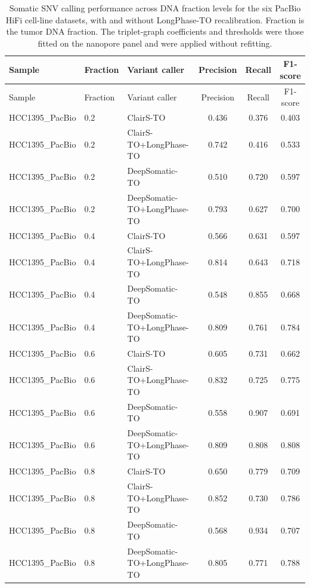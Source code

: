 \documentclass[pdflatex,sn-nature]{sn-jnl}
\begin{document}
{\small
\begin{longtable}{@{}lllccc@{}}
  \caption[Somatic SNV calling performance on the PacBio HiFi panel]%
  {Somatic SNV calling performance across DNA fraction levels for the six PacBio HiFi
  cell-line datasets, with and without LongPhase-TO recalibration. Fraction is the tumor
  DNA fraction. The triplet-graph coefficients and thresholds were those fitted on the
  nanopore panel and were applied without refitting.}
  \label{tab:pacbio_somatic_snv}\\
  \toprule
  Sample & Fraction & Variant caller & Precision & Recall & F1-score \\
  \midrule
  \endfirsthead
  \toprule
  Sample & Fraction & Variant caller & Precision & Recall & F1-score \\
  \midrule
  \endhead
  \bottomrule
  \endlastfoot
  HCC1395\_PacBio & 0.2 & ClairS-TO & 0.436 & 0.376 & 0.403 \\
  HCC1395\_PacBio & 0.2 & ClairS-TO+LongPhase-TO & 0.742 & 0.416 & 0.533 \\
  HCC1395\_PacBio & 0.2 & DeepSomatic-TO & 0.510 & 0.720 & 0.597 \\
  HCC1395\_PacBio & 0.2 & DeepSomatic-TO+LongPhase-TO & 0.793 & 0.627 & 0.700 \\
  HCC1395\_PacBio & 0.4 & ClairS-TO & 0.566 & 0.631 & 0.597 \\
  HCC1395\_PacBio & 0.4 & ClairS-TO+LongPhase-TO & 0.814 & 0.643 & 0.718 \\
  HCC1395\_PacBio & 0.4 & DeepSomatic-TO & 0.548 & 0.855 & 0.668 \\
  HCC1395\_PacBio & 0.4 & DeepSomatic-TO+LongPhase-TO & 0.809 & 0.761 & 0.784 \\
  HCC1395\_PacBio & 0.6 & ClairS-TO & 0.605 & 0.731 & 0.662 \\
  HCC1395\_PacBio & 0.6 & ClairS-TO+LongPhase-TO & 0.832 & 0.725 & 0.775 \\
  HCC1395\_PacBio & 0.6 & DeepSomatic-TO & 0.558 & 0.907 & 0.691 \\
  HCC1395\_PacBio & 0.6 & DeepSomatic-TO+LongPhase-TO & 0.809 & 0.808 & 0.808 \\
  HCC1395\_PacBio & 0.8 & ClairS-TO & 0.650 & 0.779 & 0.709 \\
  HCC1395\_PacBio & 0.8 & ClairS-TO+LongPhase-TO & 0.852 & 0.730 & 0.786 \\
  HCC1395\_PacBio & 0.8 & DeepSomatic-TO & 0.568 & 0.934 & 0.707 \\
  HCC1395\_PacBio & 0.8 & DeepSomatic-TO+LongPhase-TO & 0.805 & 0.771 & 0.788 \\

\end{longtable}}
\end{document}
